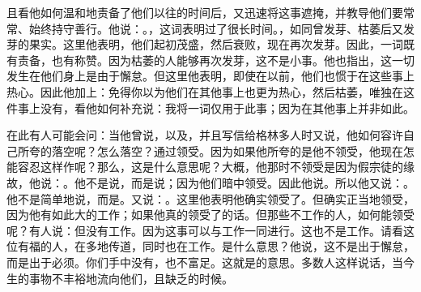 且看他如何温和地责备了他们以往的时间后，又迅速将这事遮掩，并教导他们要常常、始终持守善行。他说：。，这词表明过了很长时间。，如同曾发芽、枯萎后又发芽的果实。这里他表明，他们起初茂盛，然后衰败，现在再次发芽。因此，一词既有责备，也有称赞。因为枯萎的人能够再次发芽，这不是小事。他也指出，这一切发生在他们身上是由于懈怠。但这里他表明，即使在以前，他们也惯于在这些事上热心。因此他加上：免得你以为他们在其他事上也更为热心，然后枯萎，唯独在这件事上没有，看他如何补充说：我将一词仅用于此事；因为在其他事上并非如此。\par

在此有人可能会问：当他曾说，以及，并且写信给格林多人时又说，他如何容许自己所夸的落空呢？怎么落空？通过领受。因为如果他所夸的是他不领受，他现在怎能容忍这样作呢？那么，这是什么意思呢？大概，他那时不领受是因为假宗徒的缘故，他说：。他不是说，而是说；因为他们暗中领受。因此他说。所以他又说：。他不是简单地说，而是。又说：。这里他表明他确实领受了。但确实正当地领受，因为他有如此大的工作；如果他真的领受了的话。但那些不工作的人，如何能领受呢？有人说：但没有工作。因为这事可以与工作一同进行。这也不是工作。请看这位有福的人，在多地传道，同时也在工作。是什么意思？他说，这不是出于懈怠，而是出于必须。你们手中没有，也不富足。这就是的意思。多数人这样说话，当今生的事物不丰裕地流向他们，且缺乏的时候。\par


